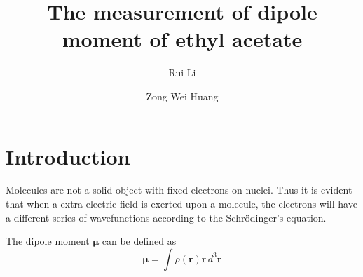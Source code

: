 \documentclass[%
 reprint,
 amsmath,amssymb,
 aps,
10.5pt,
]{revtex4-1}
\newcommand{\sch}{Schr\"odinger}
\begin{document}

\title{The measurement of dipole moment of ethyl acetate}%

\author{Rui Li}
%


\author{Zong Wei Huang}
%



\maketitle

\section{Introduction}
Molecules are not a solid object with fixed electrons on nuclei. Thus it is evident that when a extra electric field is exerted upon a molecule, the electrons will have a different series of wavefunctions according to the \sch's equation. 

The dipole moment $\bm{\mu}$ can be defined as
\begin{equation}
  \bm{\mu} = \int \rho ( \mathbf { r } ) \mathbf { r } \, d ^ { 3 } \mathbf { r }
\end{equation}
\end{document}
